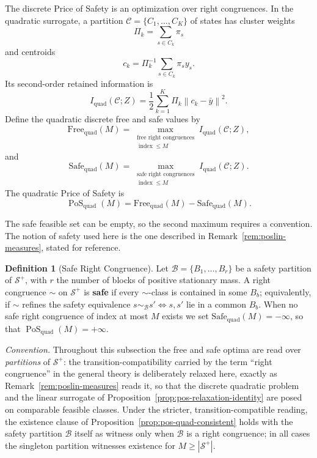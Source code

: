 \documentclass[12pt]{article}
\theoremstyle{definition}
\newtheorem{definition}[theorem]{Definition}
\DeclareMathOperator{\PoS}{PoS}
\newcommand{\norm}[1]{\left\lVert#1\right\rVert}
\newcommand{\PoSquad}{\PoS_{\mathrm{quad}}}
\newcommand{\Splus}{\mathcal S^{+}}
\begin{document}
The discrete Price of Safety is an optimization over right congruences.  In
the quadratic surrogate, a partition
$\mathcal C=\{C_1,\dots,C_K\}$ of states has cluster weights
\[
\Pi_k=\sum_{s\in C_k}\pi_s
\]
and centroids
\[
c_k=\Pi_k^{-1}\sum_{s\in C_k}\pi_s y_s.
\]
Its second-order retained information is
\[
I_{\mathrm{quad}}(\mathcal C;Z)
=
\frac12
\sum_{k=1}^K
\Pi_k
\norm{c_k-\bar y}^2.
\]
Define the quadratic discrete free and safe values by
\[
\mathrm{Free}_{\mathrm{quad}}(M)
=
\max_{\substack{
\text{free right congruences}\\
\operatorname{index}\le M
}}
I_{\mathrm{quad}}(\mathcal C;Z),
\]
and
\[
\mathrm{Safe}_{\mathrm{quad}}(M)
=
\max_{\substack{
\text{safe right congruences}\\
\operatorname{index}\le M
}}
I_{\mathrm{quad}}(\mathcal C;Z).
\]
The quadratic Price of Safety is
\[
\PoSquad(M)
=
\mathrm{Free}_{\mathrm{quad}}(M)
-
\mathrm{Safe}_{\mathrm{quad}}(M).
\]

The safe feasible set can be empty, so the second maximum requires a
convention.  The notion of safety used here is the one described in
Remark~\ref{rem:poslin-measures}, stated for reference.

\begin{definition}[Safe Right Congruence]
\label{def:safe-right-cong}
Let $\mathcal B=\{B_1,\dots,B_r\}$ be a safety partition of $\Splus$, with $r$
the number of blocks of positive stationary mass.  A right congruence $\sim$ on
$\Splus$ is \textbf{safe} if every $\sim$-class is contained in some $B_b$;
equivalently, if $\sim$ refines the safety equivalence
$s\sim_{\mathcal B}s'\iff s,s'$ lie in a common $B_b$.  When no safe right
congruence of index at most $M$ exists we set
$\mathrm{Safe}_{\mathrm{quad}}(M)=-\infty$, so that $\PoSquad(M)=+\infty$.

\emph{Convention.}  Throughout this subsection the free and safe optima are
read over \emph{partitions} of $\Splus$: the transition-compatibility
carried by the term ``right congruence'' in the general theory is
deliberately relaxed here, exactly as
Remark~\ref{rem:poslin-measures} reads it, so that the discrete quadratic
problem and the linear surrogate of
Proposition~\ref{prop:pos-relaxation-identity} are posed on comparable
feasible classes.  Under the stricter, transition-compatible reading, the
existence clause of Proposition~\ref{prop:pos-quad-consistent} holds with
the safety partition $\mathcal B$ itself as witness only when $\mathcal B$
is a right congruence; in all cases the singleton partition witnesses
existence for $M\ge|\Splus|$.
\end{definition}
\end{document}
